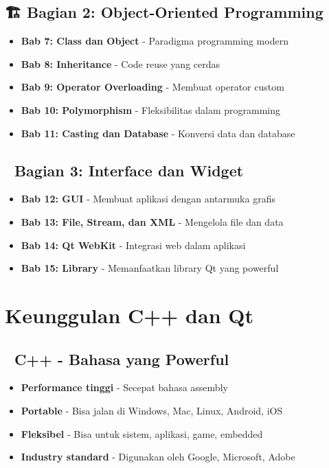 \subsection*{🏗️ Bagian 2: Object-Oriented Programming}
\begin{itemize}
\item \textbf{Bab 7: Class dan Object} - Paradigma programming modern
\item \textbf{Bab 8: Inheritance} - Code reuse yang cerdas
\item \textbf{Bab 9: Operator Overloading} - Membuat operator custom
\item \textbf{Bab 10: Polymorphism} - Fleksibilitas dalam programming
\item \textbf{Bab 11: Casting dan Database} - Konversi data dan database
\end{itemize}

\subsection*{🎨 Bagian 3: Interface dan Widget}
\begin{itemize}
\item \textbf{Bab 12: GUI} - Membuat aplikasi dengan antarmuka grafis
\item \textbf{Bab 13: File, Stream, dan XML} - Mengelola file dan data
\item \textbf{Bab 14: Qt WebKit} - Integrasi web dalam aplikasi
\item \textbf{Bab 15: Library} - Memanfaatkan library Qt yang powerful
\end{itemize}

\section*{Keunggulan C++ dan Qt}

\subsection*{🚀 C++ - Bahasa yang Powerful}
\begin{itemize}
\item \textbf{Performance tinggi} - Secepat bahasa assembly
\item \textbf{Portable} - Bisa jalan di Windows, Mac, Linux, Android, iOS
\item \textbf{Fleksibel} - Bisa untuk sistem, aplikasi, game, embedded
\item \textbf{Industry standard} - Digunakan oleh Google, Microsoft, Adobe
\end{itemize}

